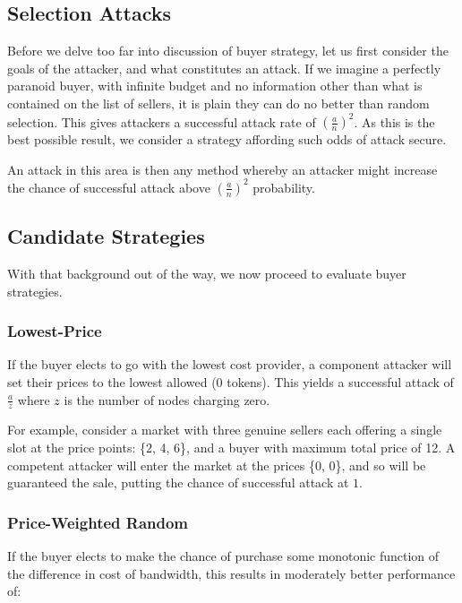 \subsection{Selection Attacks}

Before we delve too far into discussion of buyer strategy, let us
first consider the goals of the attacker, and what constitutes an
attack. If we imagine a perfectly paranoid buyer, with infinite budget
and no information other than what is contained on the list of
sellers, it is plain they can do no better than random selection. This
gives attackers a successful attack rate of $(\frac{a}{n})^2$. As this
is the best possible result, we consider a strategy affording such
odds of attack secure.

An attack in this area is then any method whereby an attacker might
increase the chance of successful attack above $(\frac{a}{n})^2$
probability.

\subsection{Candidate Strategies}

With that background out of the way, we now proceed to evaluate buyer strategies.

\subsubsection{Lowest-Price}

If the buyer elects to go with the lowest cost provider, a component
attacker will set their prices to the lowest allowed (0 tokens). This
yields a successful attack of $\frac{a}{z}$ where $z$ is the number of
nodes charging zero.

For example, consider a market with three genuine sellers each
offering a single slot at the price points: \{2, 4, 6\}, and a buyer
with maximum total price of 12. A competent attacker will enter the
market at the prices \{0, 0\}, and so will be guaranteed the sale,
putting the chance of successful attack at $1$.

\subsubsection{Price-Weighted Random}

If the buyer elects to make the chance of purchase some monotonic
function of the difference in cost of bandwidth, this results in
moderately better performance of:

